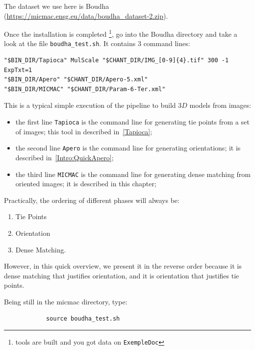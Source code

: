 \label{SHEL:TEST:BOUDHA}

The dataset we use here is Boudha (\url{https://micmac.ensg.eu/data/boudha\_dataset-2.zip}).

Once the installation is completed \footnote{tools are built and you got data
on {\tt ExempleDoc}}, go into the Boudha directory
and take a look at the file {\tt boudha\_test.sh}. It contains
$3$ command lines:

{\scriptsize
\begin{verbatim}
"$BIN_DIR/Tapioca" MulScale "$CHANT_DIR/IMG_[0-9]{4}.tif" 300 -1 ExpTxt=1
"$BIN_DIR/Apero" "$CHANT_DIR/Apero-5.xml"
"$BIN_DIR/MICMAC" "$CHANT_DIR/Param-6-Ter.xml"
\end{verbatim}
}

This is a typical simple execution of the pipeline to build $3D$ models from images:

\begin{itemize}
    \item the first line {\tt Tapioca} is the command line for generating tie points
          from a set of images; this tool in described in~\ref{Tapioca};

    \item the second line {\tt Apero} is the command line for generating orientations;
           it is described in~\ref{Intro:QuickApero};

    \item the third line {\tt MICMAC} is the command line for generating dense
          matching from oriented images; it is described in this chapter;
\end{itemize}



Practically, the ordering of different phases will always be: %

\begin{enumerate}
  \item Tie Points
  \item Orientation
  \item Dense Matching.
\end{enumerate}

However, in this quick overview, we present it in the reverse
order because it is dense matching that justifies orientation, and it is orientation
that justifies tie points.

Being still in the micmac directory, type:

\begin{center}
\begin{verbatim}
            source boudha_test.sh
\end{verbatim}
\end{center}

